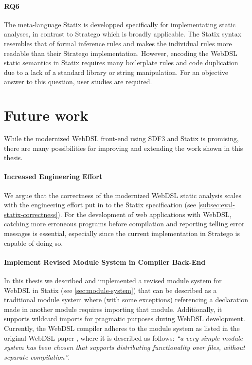     \paragraph{RQ6} The meta-language Statix is developped specifically for implementating static analyses, in contrast to Stratego which is broadly applicable. The Statix syntax resembles that of formal inference rules and makes the individual rules more readable than their Stratego implementation. However, encoding the WebDSL static semantics in Statix requires many boilerplate rules and code duplication due to a lack of a standard library or string manipulation. For an objective answer to this question, user studies are required.

  \section{\label{sec:future-work}Future work}

    While the modernized WebDSL front-end using SDF3 and Statix is promising, there are many possibilities for improving and extending the work shown in this thesis.

    \paragraph{Increased Engineering Effort} We argue that the correctness of the modernized WebDSL static analysis scales with the engineering effort put in to the Statix specification (see \cref{subsec:eval-statix-correctness}). For the development of web applications with WebDSL, catching more erroneous programs before compilation and reporting telling error messages is essential, especially since the current implementation in Stratego is capable of doing so.

    \paragraph{Implement Revised Module System in Compiler Back-End} In this thesis we described and implemented a revised module system for WebDSL in Statix (see \cref{sec:module-system}) that can be described as a traditional module system where (with some exceptions) referencing a declaration made in another module requires importing that module. Additionally, it supports wildcard imports for pragmatic purposes during WebDSL development. Currently, the WebDSL compiler adheres to the module system as listed in the original WebDSL paper \autocite{Visser2007}, where it is described as follows: \textit{``a very simple module system has been chosen that supports distributing functionality over files, without separate compilation''}. 

